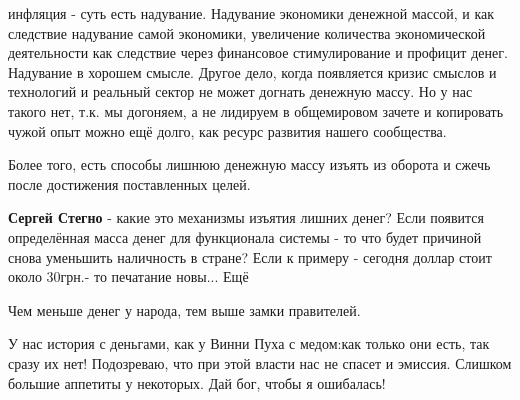 \begin{itemize}
\begin{itemize}
инфляция - суть есть надувание. Надувание экономики денежной массой, и как
следствие надувание самой экономики, увеличение количества экономической
деятельности как следствие через финансовое стимулирование и профицит денег.
Надувание в хорошем смысле. Другое дело, когда появляется кризис смыслов и
технологий и реальный сектор не может догнать денежную массу. Но у нас такого
нет, т.к. мы догоняем, а не лидируем в общемировом зачете и копировать чужой
опыт можно ещё долго, как ресурс развития нашего сообщества.

Более того, есть способы лишнюю денежную массу изъять из оборота и сжечь после
достижения поставленных целей.

\textbf{Сергей Стегно} - какие это механизмы изъятия лишних денег? Если появится определённая масса денег для функционала системы - то что будет причиной снова уменьшить наличность в стране? Если к примеру - сегодня доллар стоит около 30грн.- то печатание новы... Ещё

Чем меньше денег у народа, тем выше замки правителей.


У нас история с деньгами, как у Винни Пуха с медом:как только они есть, так сразу
их нет! Подозреваю, что при этой власти нас не спасет и эмиссия. Слишком большие
аппетиты у некоторых. Дай бог, чтобы я ошибалась!

\end{itemize} %

\end{itemize} %
